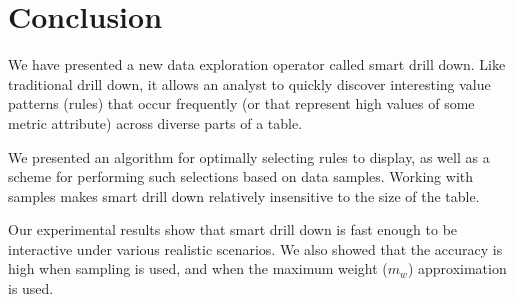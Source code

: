 

\section{Conclusion}\label{sec:conclusion}
We have presented a new data exploration operator called smart drill down.
Like traditional drill down, it allows an analyst
to quickly discover interesting value patterns (rules) that occur frequently
(or that represent high values of some metric attribute)
across diverse parts of a table.

We presented an algorithm for optimally selecting rules
to display, as well as a scheme for performing such selections
based on data samples. Working with samples makes smart drill down
relatively insensitive to the size of the table.

Our experimental results show that smart drill down
is fast enough to be interactive under various
realistic scenarios. We also showed that the accuracy is high
when sampling is used, and when the maximum weight ($m_w$)
approximation is used.